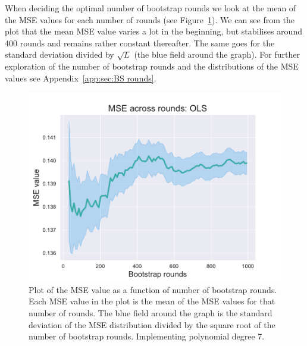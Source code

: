 \documentclass[twocolumn,english,notitlepage]{article}
\begin{document}
            When deciding the optimal number of bootstrap rounds we look at the mean of the MSE values for each number of rounds (see Figure~\ref{res:fig:bs_mse_across_rounds}). We can see from the plot that the mean MSE value varies a lot in the beginning, but stabilises around 400 rounds and remains rather constant thereafter. The same goes for the standard deviation divided by $\sqrt{L}$ (the blue field around the graph). For further exploration of the number of bootstrap rounds and the distributions of the MSE values see Appendix~\ref{app:sec:BS rounds}.
            \begin{figure}[ht]
                \centering
                \includegraphics[width=.9\linewidth]{BS_mse_across_rounds_OLS.pdf}
                \caption{Plot of the MSE value as a function of number of bootstrap rounds. Each MSE value in the plot is the mean of the MSE values for that number of rounds. The blue field around the graph is the standard deviation of the MSE distribution divided by the square root of the number of bootstrap rounds. Implementing polynomial degree 7.}
                \label{res:fig:bs_mse_across_rounds}
            \end{figure}
 
\end{document}
